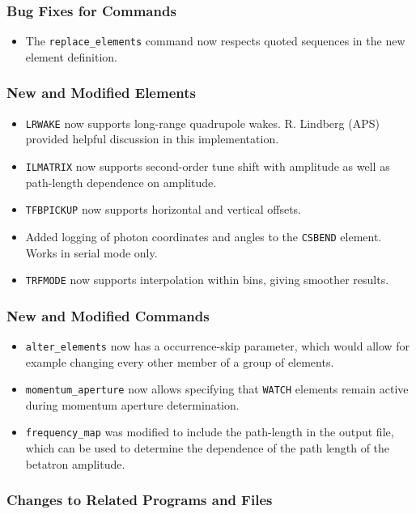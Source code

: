 \documentclass[11pt]{article}
\begin{document}
\subsubsection{Bug Fixes for Commands}
\begin{itemize}
\item The \verb|replace_elements| command now respects quoted sequences in the new element definition.
\end{itemize}

\subsubsection{New and Modified Elements}
\begin{itemize}
\item \verb|LRWAKE| now supports long-range quadrupole wakes. R. Lindberg (APS) provided helpful
  discussion in this implementation.
\item \verb|ILMATRIX| now supports second-order tune shift with amplitude as well as path-length dependence
  on amplitude.
\item \verb|TFBPICKUP| now supports horizontal and vertical offsets.
\item Added logging of photon coordinates and angles to the \verb|CSBEND| element. Works in serial mode only.
\item \verb|TRFMODE| now supports interpolation within bins, giving smoother results.
\end{itemize}

\subsubsection{New and Modified Commands}
\begin{itemize}
\item \verb|alter_elements| now has a occurrence-skip parameter, which would allow for example changing every other
  member of a group of elements.
\item \verb|momentum_aperture| now allows specifying that \verb|WATCH| elements remain active during momentum aperture
  determination.
\item \verb|frequency_map| was modified to include the path-length in the output file, which can be used to determine
  the dependence of the path length of the betatron amplitude.
\end{itemize}

\subsubsection{Changes to Related Programs and Files}
\end{document}
